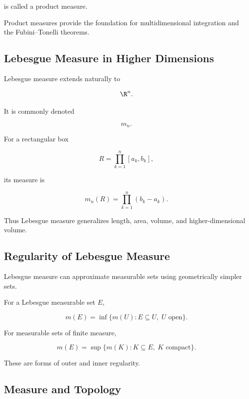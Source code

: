 is called a product measure.

Product measures provide the foundation for multidimensional integration
and the Fubini--Tonelli theorems.

\subsection{Lebesgue Measure in Higher Dimensions}
\label{subsec:lebesgue-higher-dimensions}

Lebesgue measure extends naturally to

\[
\R^n.
\]

It is commonly denoted

\[
m_n.
\]

For a rectangular box

\[
R=
\prod_{k=1}^{n}[a_k,b_k],
\]

its measure is

\[
\boxed{
m_n(R)
=
\prod_{k=1}^{n}(b_k-a_k).
}
\]

Thus Lebesgue measure generalizes length, area, volume, and
higher-dimensional volume.

\subsection{Regularity of Lebesgue Measure}
\label{subsec:regularity-lebesgue-measure}

Lebesgue measure can approximate measurable sets using geometrically
simpler sets.

For a Lebesgue measurable set \(E\),

\[
\boxed{
m(E)
=
\inf
\{
m(U):
E\subseteq U,\;
U\text{ open}
\}.
}
\]

For measurable sets of finite measure,

\[
\boxed{
m(E)
=
\sup
\{
m(K):
K\subseteq E,\;
K\text{ compact}
\}.
}
\]

These are forms of outer and inner regularity.

\subsection{Measure and Topology}
\label{subsec:measure-and-topology}

